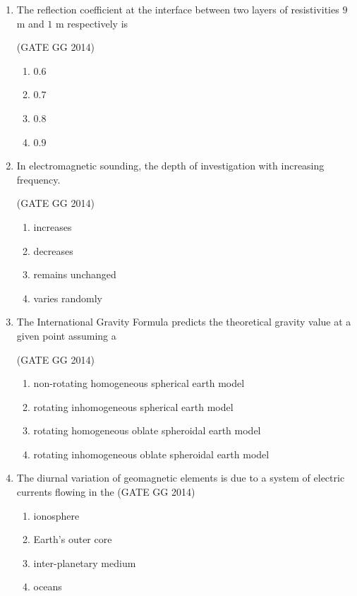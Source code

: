 \documentclass[journal]{IEEEtran}
\begin{document}
\begin{enumerate}[start=1]
\begin{enumerate}
\end{enumerate}

\item The reflection coefficient at the interface between two layers of resistivities $9$ \ohm m and $1$ \ohm m respectively is

\hfill{(GATE GG 2014)}\\
\begin{multicols}{2}
    \begin{enumerate}
    \item  $0.6$
\item  $0.7$
\item  $0.8$
\item  $0.9$
\end{enumerate}
\end{multicols}


\item In electromagnetic  sounding, the depth of investigation  with \makebox[1cm]{\hrulefill} increasing frequency.

\hfill{(GATE GG 2014)}\\
\begin{multicols}{2}
    \begin{enumerate}
    \item  increases
\item  decreases
\item  remains unchanged
\item  varies randomly
\end{enumerate}
\end{multicols}


\item  The International Gravity Formula predicts the theoretical gravity value at a given point assuming a

\hfill{(GATE GG 2014)}\\
\begin{enumerate}
    \item  non-rotating homogeneous spherical earth model
\item  rotating inhomogeneous spherical earth model
\item  rotating homogeneous oblate spheroidal earth model
\item  rotating inhomogeneous oblate spheroidal earth model
\end{enumerate}

\item The diurnal variation of geomagnetic elements is due to a system of electric currents flowing in the
\hfill{(GATE GG 2014)}\\
\begin{enumerate}
    \item  ionosphere
\item  Earth's outer core
\item  inter-planetary medium
\item  oceans
\end{enumerate}


\end{enumerate}
\end{document}
